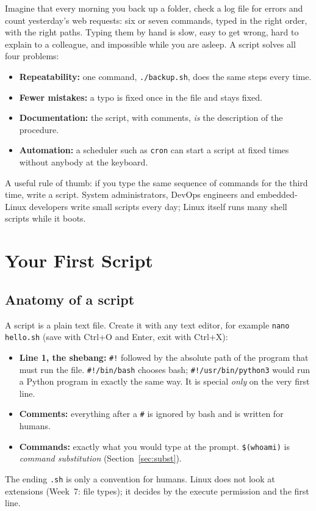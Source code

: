 \documentclass[11pt,a4paper]{article}
\newcommand{\cmd}[1]{\texttt{#1}}
\begin{document}
Imagine that every morning you back up a folder, check a log file for errors and count yesterday's web requests: six or seven commands, typed in the right order, with the right paths. Typing them by hand is slow, easy to get wrong, hard to explain to a colleague, and impossible while you are asleep. A script solves all four problems:
\begin{itemize}
  \item \textbf{Repeatability:} one command, \texttt{./backup.sh}, does the same steps every time.
  \item \textbf{Fewer mistakes:} a typo is fixed once in the file and stays fixed.
  \item \textbf{Documentation:} the script, with comments, \emph{is} the description of the procedure.
  \item \textbf{Automation:} a scheduler such as \cmd{cron} can start a script at fixed times without anybody at the keyboard.
\end{itemize}
A useful rule of thumb: if you type the same sequence of commands for the third time, write a script. System administrators, DevOps engineers and embedded-Linux developers write small scripts every day; Linux itself runs many shell scripts while it boots.

\section{Your First Script}

\subsection{Anatomy of a script}

A script is a plain text file. Create it with any text editor, for example \cmd{nano hello.sh} (save with Ctrl+O and Enter, exit with Ctrl+X):



\begin{itemize}
  \item \textbf{Line 1, the shebang:} \texttt{\#!} followed by the absolute path of the program that must run the file. \texttt{\#!/bin/bash} chooses bash; \texttt{\#!/usr/bin/python3} would run a Python program in exactly the same way. It is special \emph{only} on the very first line.
  \item \textbf{Comments:} everything after a \texttt{\#} is ignored by bash and is written for humans.
  \item \textbf{Commands:} exactly what you would type at the prompt. \texttt{\$(whoami)} is \emph{command substitution} (Section~\ref{sec:subst}).
\end{itemize}
The ending \texttt{.sh} is only a convention for humans. Linux does not look at extensions (Week~7: file types); it decides by the execute permission and the first line.
\end{document}
